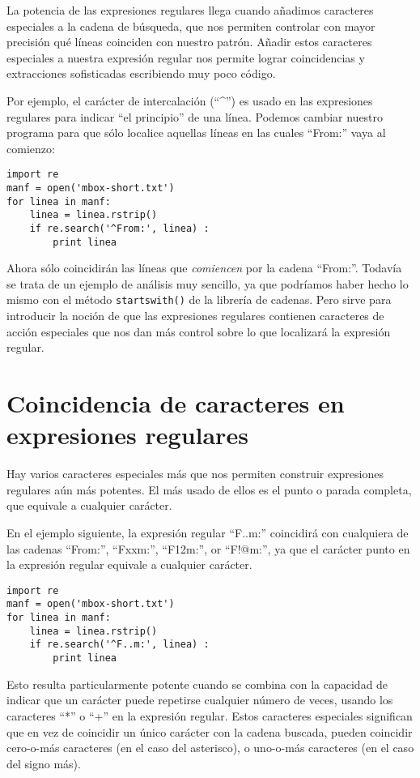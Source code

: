 La potencia de las expresiones regulares llega cuando añadimos caracteres especiales a la cadena de
búsqueda, que nos permiten controlar con mayor precisión qué líneas coinciden con nuestro patrón.
Añadir estos caracteres especiales a nuestra expresión regular nos permite lograr coincidencias y
extracciones sofisticadas escribiendo muy poco código.

Por ejemplo, el carácter de intercalación (``^'') es usado en las expresiones
regulares para indicar ``el principio'' de una línea.
Podemos cambiar nuestro programa para que sólo localice
aquellas líneas en las cuales ``From:'' vaya al comienzo:

\beforeverb
\begin{verbatim}
import re
manf = open('mbox-short.txt')
for linea in manf:
    linea = linea.rstrip()
    if re.search('^From:', linea) :
        print linea
\end{verbatim}
\afterverb
%
Ahora sólo coincidirán las líneas que {\em comiencen} por la cadena ``From:''. Todavía se trata
de un ejemplo de análisis muy sencillo, ya que podríamos haber hecho lo mismo con el método
{\tt startswith()} de la librería de cadenas. Pero sirve para introducir la noción de que las expresiones
regulares contienen caracteres de acción especiales que nos dan más control sobre lo que localizará
la expresión regular.

\section{Coincidencia de caracteres en expresiones regulares}

Hay varios caracteres especiales más que nos permiten construir expresiones regulares aún más potentes.
El más usado de ellos es el punto o parada completa, que equivale
a cualquier carácter.

En el ejemplo siguiente, la expresión regular ``F..m:'' coincidirá con cualquiera de las cadenas
``From:'', ``Fxxm:'', ``F12m:'', or ``F!@m:'', ya que el carácter punto en la expresión regular
equivale a cualquier carácter.

\beforeverb
\begin{verbatim}
import re
manf = open('mbox-short.txt')
for linea in manf:
    linea = linea.rstrip()
    if re.search('^F..m:', linea) :
        print linea
\end{verbatim}
\afterverb
%
Esto resulta particularmente potente cuando se combina con la capacidad de indicar que un carácter
puede repetirse cualquier número de veces, usando los caracteres ``*'' o ``+'' en la expresión regular.
Estos caracteres especiales significan que en vez de coincidir un único carácter con la cadena buscada,
pueden coincidir cero-o-más caracteres (en el caso del asterisco), o uno-o-más caracteres
(en el caso del signo más).


